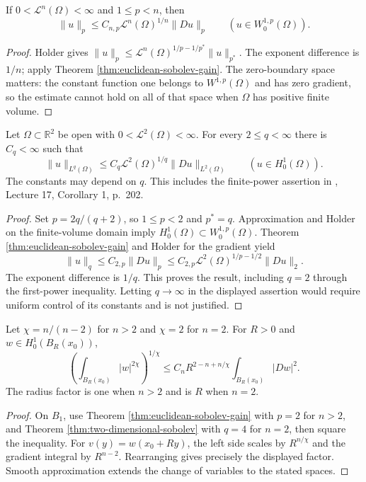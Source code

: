 \begin{corollary}\label{cor:volume-poincare}
If $0<\mathcal L^n(\Omega)<\infty$ and $1\leq p<n$, then
\[
 \|u\|_p\leq C_{n,p}\mathcal L^n(\Omega)^{1/n}\|Du\|_p
 \qquad(u\in W^{1,p}_0(\Omega)).
\]
\end{corollary}
\begin{proof}
Holder gives $\|u\|_p\leq\mathcal L^n(\Omega)^{1/p-1/p^*}\|u\|_{p^*}$. The exponent difference is $1/n$; apply Theorem \ref{thm:euclidean-sobolev-gain}. The zero-boundary space matters: the constant function one belongs to $W^{1,p}(\Omega)$ and has zero gradient, so the estimate cannot hold on all of that space when $\Omega$ has positive finite volume.
\end{proof}

\begin{theorem}\label{thm:two-dimensional-sobolev}
Let $\Omega\subset\mathbb R^2$ be open with $0<\mathcal L^2(\Omega)<\infty$. For every $2\leq q<\infty$ there is $C_q<\infty$ such that
\[
 \|u\|_{L^q(\Omega)}\leq C_q\mathcal L^2(\Omega)^{1/q}\|Du\|_{L^2(\Omega)}
 \qquad(u\in H_0^1(\Omega)).
\]
The constants may depend on $q$. This includes the finite-power assertion in \cite{SimonPDE}, Lecture 17, Corollary 1, p.~202.
\end{theorem}
\begin{proof}
Set $p=2q/(q+2)$, so $1\leq p<2$ and $p^*=q$. Approximation and Holder on the finite-volume domain imply $H_0^1(\Omega)\subset W^{1,p}_0(\Omega)$. Theorem \ref{thm:euclidean-sobolev-gain} and Holder for the gradient yield
\[
 \|u\|_q\leq C_{2,p}\|Du\|_p
 \leq C_{2,p}\mathcal L^2(\Omega)^{1/p-1/2}\|Du\|_2.
\]
The exponent difference is $1/q$. This proves the result, including $q=2$ through the first-power inequality. Letting $q\to\infty$ in the displayed assertion would require uniform control of its constants and is not justified.
\end{proof}

\begin{corollary}\label{cor:scaled-sobolev-ball}
Let $\chi=n/(n-2)$ for $n>2$ and $\chi=2$ for $n=2$. For $R>0$ and $w\in H_0^1(B_R(x_0))$,
\[
 \left(\int_{B_R(x_0)}|w|^{2\chi}\right)^{1/\chi}
 \leq C_n R^{2-n+n/\chi}\int_{B_R(x_0)}|Dw|^2.
\]
The radius factor is one when $n>2$ and is $R$ when $n=2$.
\end{corollary}
\begin{proof}
On $B_1$, use Theorem \ref{thm:euclidean-sobolev-gain} with $p=2$ for $n>2$, and Theorem \ref{thm:two-dimensional-sobolev} with $q=4$ for $n=2$, then square the inequality. For $v(y)=w(x_0+Ry)$, the left side scales by $R^{n/\chi}$ and the gradient integral by $R^{n-2}$. Rearranging gives precisely the displayed factor. Smooth approximation extends the change of variables to the stated spaces.
\end{proof}

